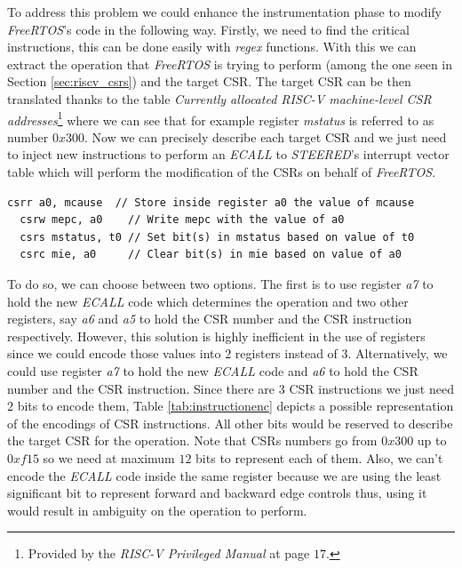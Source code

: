 To address this problem we could enhance the instrumentation phase to modify \textit{FreeRTOS}'s
code in the following way. Firstly, we need to find the critical instructions, this
can be done easily with \textit{regex} functions. With this we can extract the operation
that \textit{FreeRTOS} is trying to perform (among the one seen in Section \ref{sec:riscv_csrs})
and the target CSR. The target CSR can be then translated thanks to the table \textit{Currently
allocated RISC-V machine-level CSR addresses}\footnote{Provided by the \textit{RISC-V
Privileged Manual}\cite{riscv} at page $17$.} where we can see that for example register
\textit{mstatus} is referred to as number $0x300$. Now we can precisely describe
each target CSR and we just need to inject new instructions to perform an \textit{ECALL}
to \textit{STEERED}'s interrupt vector table which will perform the modification
of the CSRs on behalf of \textit{FreeRTOS}.

\begin{lstlisting}[style=Assembly, caption = \textit{FreeRTOS} operations on Control and Status Registers, label={lst:freeoperations}]
  csrr a0, mcause  // Store inside register a0 the value of mcause
  csrw mepc, a0    // Write mepc with the value of a0
  csrs mstatus, t0 // Set bit(s) in mstatus based on value of t0
  csrc mie, a0     // Clear bit(s) in mie based on value of a0
  \end{lstlisting}

To do so, we can choose between two options. The first is to use register \textit{a7}
to hold the new \textit{ECALL} code which determines the operation and two other
registers, say \textit{a6} and \textit{a5} to hold the CSR number and the CSR
instruction respectively. However, this solution is highly inefficient in the
use of registers since we could encode those values into $2$ registers instead
of $3$. Alternatively, we could use register \textit{a7} to hold the new \textit{ECALL}
code and \textit{a6} to hold the CSR number and the CSR instruction. Since there
are $3$ CSR instructions we just need $2$ bits to encode them, Table \ref{tab:instructionenc}
depicts a possible representation of the encodings of CSR instructions. All
other bits would be reserved to describe the target CSR for the operation. Note that
CSRs numbers go from $0x300$ up to $0xf15$ so we need at maximum $12$ bits to represent
each of them. Also, we can't encode the \textit{ECALL} code inside the same
register because we are using the least significant bit to represent forward and
backward edge controls thus, using it would result in ambiguity on the operation
to perform.

